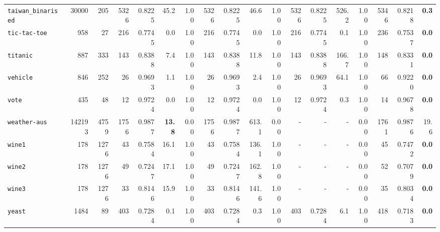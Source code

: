 \begin{tabular}{lccrrrrrrrrrrrrrrr}
\texttt{taiwan\_binarised} & \multicolumn{1}{r}{30000} & \multicolumn{1}{r}{205}  & 5326 & 0.8225 & 45.2 & 1.00 & 5326 & 0.8225 & 46.6 & 1.00 & 5326 & 0.8225 & 526.2 & 1.00 & 5346 & 0.8218 & \textbf{0.3}\\
\texttt{tic-tac-toe} & \multicolumn{1}{r}{958} & \multicolumn{1}{r}{27}  & 216 & 0.7745 & 0.0 & 1.00 & 216 & 0.7745 & 0.0 & 1.00 & 216 & 0.7745 & 0.1 & 1.00 & 236 & 0.7537 & \textbf{0.0}\\
\texttt{titanic} & \multicolumn{1}{r}{887} & \multicolumn{1}{r}{333}  & 143 & 0.8388 & 7.4 & 1.00 & 143 & 0.8388 & 11.8 & 1.00 & 143 & 0.8388 & 166.7 & 1.00 & 148 & 0.8331 & \textbf{0.0}\\
\texttt{vehicle} & \multicolumn{1}{r}{846} & \multicolumn{1}{r}{252}  & 26 & 0.9693 & 1.1 & 1.00 & 26 & 0.9693 & 2.4 & 1.00 & 26 & 0.9693 & 64.1 & 1.00 & 66 & 0.9220 & \textbf{0.0}\\
\texttt{vote} & \multicolumn{1}{r}{435} & \multicolumn{1}{r}{48}  & 12 & 0.9724 & 0.0 & 1.00 & 12 & 0.9724 & 0.0 & 1.00 & 12 & 0.9724 & 0.3 & 1.00 & 14 & 0.9678 & \textbf{0.0}\\
\texttt{weather-aus} & \multicolumn{1}{r}{142193} & \multicolumn{1}{r}{4759}  & 1756 & 0.9877 & \textbf{13.8} & 0.00 & 1756 & 0.9877 & 613.1 & 0.00 & - & - & - & 0.00 & 1761 & 0.9876 & 19.6\\
\texttt{wine1} & \multicolumn{1}{r}{178} & \multicolumn{1}{r}{1276}  & 43 & 0.7584 & 16.1 & 1.00 & 43 & 0.7584 & 136.1 & 1.00 & - & - & - & 0.00 & 45 & 0.7472 & \textbf{0.0}\\
\texttt{wine2} & \multicolumn{1}{r}{178} & \multicolumn{1}{r}{1276}  & 49 & 0.7247 & 17.1 & 1.00 & 49 & 0.7247 & 162.8 & 1.00 & - & - & - & 0.00 & 52 & 0.7079 & \textbf{0.0}\\
\texttt{wine3} & \multicolumn{1}{r}{178} & \multicolumn{1}{r}{1276}  & 33 & 0.8146 & 15.9 & 1.00 & 33 & 0.8146 & 141.6 & 1.00 & - & - & - & 0.00 & 35 & 0.8034 & \textbf{0.0}\\
\texttt{yeast} & \multicolumn{1}{r}{1484} & \multicolumn{1}{r}{89}  & 403 & 0.7284 & 0.1 & 1.00 & 403 & 0.7284 & 0.3 & 1.00 & 403 & 0.7284 & 6.1 & 1.00 & 418 & 0.7183 & \textbf{0.0}\\
\bottomrule
\end{tabular}
